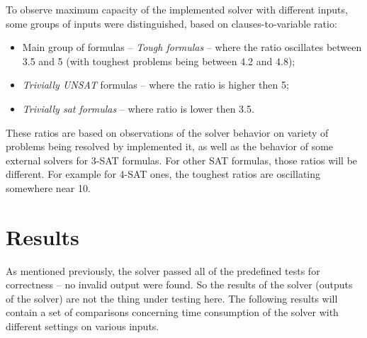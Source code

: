 \documentclass[12pt,english,pdflatex]{aghdpl}
\begin{document}
To observe maximum capacity of the implemented solver with different inputs,
some groups of inputs were distinguished, based on clauses-to-variable
ratio:
\begin{itemize}
\item Main group of formulas -- \textit{Tough formulas} -- where the ratio oscillates
between 3.5 and 5 (with toughest problems being between 4.2 and 4.8); 
\item \textit{Trivially UNSAT} formulas -- where the ratio is higher then 5;
\item \textit{Trivially sat formulas} -- where ratio is lower then 3.5.
\end{itemize}
These ratios are based on observations of the solver behavior on variety of problems being
resolved by implemented it, as well as the behavior of some external solvers for
3-SAT formulas. For other SAT formulas, those ratios will be different.
For example for 4-SAT ones, the toughest ratios are oscillating somewhere near 10.

\section{Results}
As mentioned previously, the solver passed all of the predefined tests for correctness -- no invalid output were found. So the results of the solver (outputs of the solver) are not the thing under testing here. The following results will contain a set of comparisons concerning  time consumption of the solver with different settings on various inputs.
\end{document}
